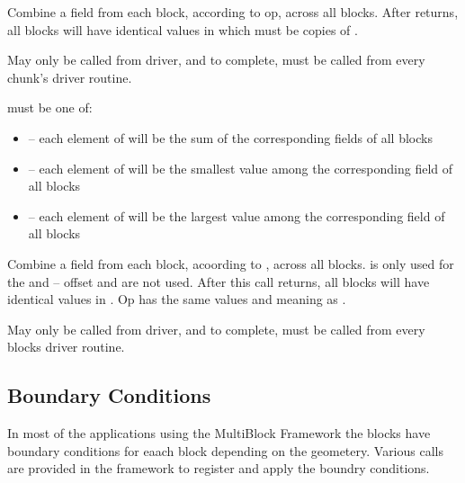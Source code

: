 \documentclass[10pt]{article}
\begin{document}
     Combine a field from each block, according to op, across all blocks.
     After  returns, all blocks will have identical
values in  which must be  copies of .

     May only be called from driver, and to complete, must be called
     from every chunk's driver routine.

      must be one of:

\begin{itemize}
        \item {}-- each element of  will be the sum 
of the corresponding fields of all blocks
        \item {}-- each element of  will be the 
smallest value among the corresponding field of all blocks
        \item {}-- each element of  will be the largest 
value among the corresponding field of all blocks
\end{itemize}
\vspace{0.2in}


     Combine a field from each block, acoording to , across all blocks.
 is only used for the  and -- offset and
 are not used.  After this call returns, all blocks will have
identical values in .  Op has the same values and meaning as
.

     May only be called from driver, and to complete, must be called
     from every blocks driver routine.

\vspace{0.2in}

\subsection{Boundary Conditions}
In most of the applications using the MultiBlock Framework the blocks have 
boundary conditions for eaach block depending on the geometery. Various calls 
are provided in the framework to register and apply the boundry conditions.

\end{document}
